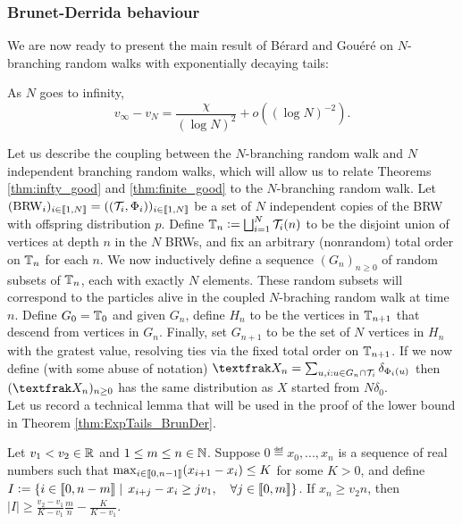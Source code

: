 \subsubsection{Brunet-Derrida behaviour}\label{sec:ExpTails_BrunDer}

We are now ready to present the main result of Bérard and Gouéré on $N$-branching random walks with exponentially decaying tails:
\begin{theorem}\label{thm:ExpTails_BrunDer}
As $N$ goes to infinity, 
\begin{equation}
v_\infty - v_N = \frac{\chi}{(\log N)^2} + o((\log N)^{-2}). 
\end{equation}
\end{theorem}

Let us describe the coupling between the $N$-branching random walk and $N$ independent branching random walks, which will allow us to relate Theorems \ref{thm:infty_good} and \ref{thm:finite_good} to the $N$-branching random walk. Let $(\text{BRW}_i)_{i \in \llbracket1,N\rrbracket} = ((\mathcal{T}_i, \Phi_i))_{i \in \llbracket1,N\rrbracket}$ be a set of $N$ independent copies of the BRW with offspring distribution $p$. Define $\mathbb{T}_n \vcentcolon= \bigsqcup_{i=1}^N \mathcal{T}_i(n)$ to be the disjoint union of vertices at depth $n$ in the $N$ BRWs, and fix an arbitrary (nonrandom) total order on $\mathbb{T}_n$ for each $n$. We now inductively define a sequence $(G_n)_{n \geq 0}$ of random subsets of $\mathbb{T}_n$, each with exactly $N$ elements. These random subsets will correspond to the particles alive in the coupled $N$-braching random walk at time $n$. Define $G_0 = \mathbb{T}_0$ and given $G_n$, define $H_n$ to be the vertices in $\mathbb{T}_{n+1}$ that descend from vertices in $G_n$. Finally, set $G_{n+1}$ to be the set of $N$ vertices in $H_n$ with the gratest value, resolving ties via the fixed total order on $\mathbb{T}_{n+1}$. If we now define (with some abuse of notation) $\frak{X}_n = \sum_{u,i : u \in G_n \cap \cal{T}_i} \delta_{\Phi_i(u)}$ then $(\frak{X}_n)_{n \geq 0}$ has the same distribution as $X$ started from $N \delta_0$. \\
Let us record a technical lemma that will be used in the proof of the lower bound in Theorem \ref{thm:ExpTails_BrunDer}. 

\begin{lemma}\label{lem:ExpTails_technical}
Let $v_1 < v_2 \in \mathbb{R}$ and $1 \leq m \leq n \in \mathbb{N}$. Suppose $0 \eqdef x_0, ..., x_n$ is a sequence of real numbers such that $\max_{i \in \llbracket0, n - 1\rrbracket} (x_{i+1} - x_i) \leq K$ for some $K > 0$, and define $I \vcentcolon= \{ i \in \llbracket0, n - m\rrbracket \mid\, x_{i + j} - x_i \geq j v_1,\quad \forall j\in\llbracket0,m\rrbracket\}$. If $x_n \geq v_2 n$, then $|I| \geq \frac{v_2 - v_1}{K - v_1}\frac{m}{n} - \frac{K}{K - v_1}$. 
\end{lemma}

